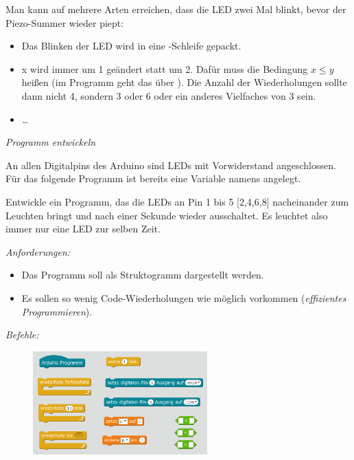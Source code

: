 \documentclass[ngerman, 11pt]{scrreprt}
\begin{document}
	Man kann auf mehrere Arten erreichen, dass die LED zwei Mal blinkt, bevor der Piezo-Summer wieder piept:
	\begin{itemize}
		\item Das Blinken der LED wird in eine -Schleife gepackt.
		\item x wird immer um 1 geändert statt um 2. Dafür muss die Bedingung $x\leq y$ heißen (im Programm geht das über ). Die Anzahl der Wiederholungen sollte dann nicht 4, sondern 3 oder 6 oder ein anderes Vielfaches von 3 sein.
		\item \dots
	\end{itemize}
	
	\bigskip
	\begin{aufgabe} \emph{Programm entwickeln}
		
		An allen Digitalpins des Arduino sind LEDs mit Vorwiderstand angeschlossen.	Für das folgende Programm ist bereits eine Variable namens  angelegt. 
		
		Entwickle ein Programm, das die LEDs an Pin 1 bis 5 [2,4,6,8] nacheinander zum Leuchten bringt und nach einer Sekunde wieder ausschaltet. Es leuchtet also immer nur eine LED zur selben Zeit. 
		
		\medskip
		\emph{Anforderungen:}
		\begin{itemize}[noitemsep]
			\item Das Programm soll als Struktogramm dargestellt werden.
			\item Es sollen so wenig Code-Wiederholungen wie möglich vorkommen (\emph{effizientes Programmieren}).
		\end{itemize}
		
		\emph{Befehle:}
		\begin{figure}[H]
			\centering
			\includegraphics[width=0.6\textwidth]{../pics/Uebung-Programm-entwickeln-Befehlssammlung.png}
		\end{figure}
	\end{aufgabe}
	
\end{document}

